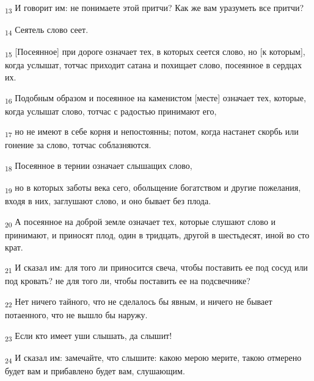 \begin{tcolorbox}
\textsubscript{13} И говорит им: не понимаете этой притчи? Как же вам уразуметь все притчи?
\end{tcolorbox}
\begin{tcolorbox}
\textsubscript{14} Сеятель слово сеет.
\end{tcolorbox}
\begin{tcolorbox}
\textsubscript{15} [Посеянное] при дороге означает тех, в которых сеется слово, но [к которым], когда услышат, тотчас приходит сатана и похищает слово, посеянное в сердцах их.
\end{tcolorbox}
\begin{tcolorbox}
\textsubscript{16} Подобным образом и посеянное на каменистом [месте] означает тех, которые, когда услышат слово, тотчас с радостью принимают его,
\end{tcolorbox}
\begin{tcolorbox}
\textsubscript{17} но не имеют в себе корня и непостоянны; потом, когда настанет скорбь или гонение за слово, тотчас соблазняются.
\end{tcolorbox}
\begin{tcolorbox}
\textsubscript{18} Посеянное в тернии означает слышащих слово,
\end{tcolorbox}
\begin{tcolorbox}
\textsubscript{19} но в которых заботы века сего, обольщение богатством и другие пожелания, входя в них, заглушают слово, и оно бывает без плода.
\end{tcolorbox}
\begin{tcolorbox}
\textsubscript{20} А посеянное на доброй земле означает тех, которые слушают слово и принимают, и приносят плод, один в тридцать, другой в шестьдесят, иной во сто крат.
\end{tcolorbox}
\begin{tcolorbox}
\textsubscript{21} И сказал им: для того ли приносится свеча, чтобы поставить ее под сосуд или под кровать? не для того ли, чтобы поставить ее на подсвечнике?
\end{tcolorbox}
\begin{tcolorbox}
\textsubscript{22} Нет ничего тайного, что не сделалось бы явным, и ничего не бывает потаенного, что не вышло бы наружу.
\end{tcolorbox}
\begin{tcolorbox}
\textsubscript{23} Если кто имеет уши слышать, да слышит!
\end{tcolorbox}
\begin{tcolorbox}
\textsubscript{24} И сказал им: замечайте, что слышите: какою мерою мерите, такою отмерено будет вам и прибавлено будет вам, слушающим.
\end{tcolorbox}
